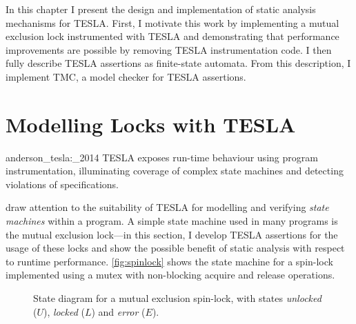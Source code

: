 In this chapter I present the design and implementation of static analysis
mechanisms for TESLA. First, I motivate this work by implementing a mutual
exclusion lock instrumented with TESLA and demonstrating that performance
improvements are possible by removing TESLA instrumentation code. I then
fully describe TESLA assertions as finite-state automata. From this description,
I implement TMC, a model checker for TESLA assertions.

\section{Modelling Locks with TESLA} \label{sec:locks}

\begin{displaycquote}[p. 1]{anderson_tesla:_2014}
TESLA exposes run-time behaviour using program instrumentation, illuminating
coverage of complex state machines and detecting violations of specifications.
\end{displaycquote}

\textcite{anderson_tesla:_2014} draw attention to the suitability of TESLA for
modelling and verifying \emph{state machines} within a program. A simple state
machine used in many programs is the mutual exclusion lock---in this section, I
develop TESLA assertions for the usage of these locks and show the possible
benefit of static analysis with respect to runtime performance.
\autoref{fig:spinlock} shows the state machine for a spin-lock implemented using
a mutex with non-blocking acquire and release operations.

\begin{figure}
  \centering
  \caption{State diagram for a mutual exclusion spin-lock, with states
  \emph{unlocked} ($U$), \emph{locked} ($L$) and \emph{error} ($E$).}
  \label{fig:spinlock}
\end{figure}

